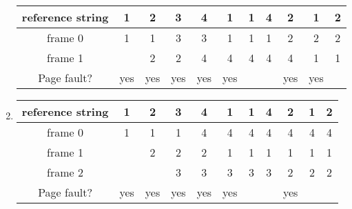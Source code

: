 \documentclass[a4paper]{article}
\begin{document}
\begin{enumerate}[label=\alph*)]
\begin{tabular}{|c|c|c|c|c|c|c|c|c|c|c|}
        \hline
        reference string&1&2&3&4&1&1&4&2&1&2 \\ \hline
        frame 0&1&1&3&3&1&1&1&2&2&2 \\ \hline
        frame 1&&2&2&4&4&4&4&4&1&1 \\ \hline
        Page fault?&yes&yes&yes&yes&yes&&&yes&yes& \\ \hline
    \end{tabular}
    \item
    \begin{tabular}{|c|c|c|c|c|c|c|c|c|c|c|}
        \hline
        reference string&1&2&3&4&1&1&4&2&1&2 \\ \hline
        frame 0&1&1&1&4&4&4&4&4&4&4 \\ \hline
        frame 1&&2&2&2&1&1&1&1&1&1 \\ \hline
        frame 2&&&3&3&3&3&3&2&2&2 \\ \hline
        Page fault?&yes&yes&yes&yes&yes&&&yes&& \\ \hline
    \end{tabular}
\end{enumerate}
\end{document}
